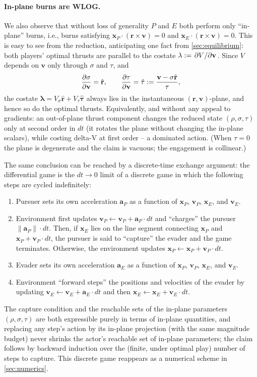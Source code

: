 \documentclass{article}
\newcommand{\eqdef}{:=}
\renewcommand{\vec}[1]{\mathbf{#1}}
\theoremstyle{remark}
\begin{document}
\paragraph{In-plane burns are WLOG.}
We also observe that without loss of generality $P$ and $E$ both perform only
``in-plane'' burns, i.e., burns satisfying
$\ddot{\vec{x}}_P \cdot (\vec{r} \times \vec{v}) = 0$ and
$\ddot{\vec{x}}_E \cdot ( \vec{r} \times \vec{v}) = 0$.  This is easy to
see from the reduction, anticipating one fact from \cref{sec:equilibrium}:
both players' optimal thrusts are parallel to the costate
$\vec\lambda \eqdef \pdv*{V}{\vec v}$.  Since $V$ depends on $\vec v$ only
through $\sigma$ and $\tau$, and
\[
  \pdv{\sigma}{\vec v} = \hat{\vec r}, \qquad
  \pdv{\tau}{\vec v} = \hat{\vec\tau} \eqdef \frac{\vec v - \sigma \hat{\vec
      r}}{\tau},
\]
the costate
$\vec\lambda = V_\sigma \hat{\vec r} + V_\tau \hat{\vec\tau}$ always lies in
the instantaneous $(\vec r, \vec v)$-plane, and hence so do the optimal
thrusts.  Equivalently, and without any appeal to gradients: an out-of-plane
thrust component changes the reduced state $(\rho, \sigma, \tau)$ only at
second order in $dt$ (it rotates the plane without changing the in-plane
scalars), while costing delta-V at first order -- a dominated action.  (When
$\tau = 0$ the plane is degenerate and the claim is vacuous; the engagement
is collinear.)

The same conclusion can be reached by a discrete-time
exchange argument: the differential game is the $dt \to 0$ limit of a discrete
game in which the following steps are cycled indefinitely:
\begin{enumerate}
\item Pursuer sets its own acceleration $\vec{a}_P$ as a function of
  $\vec{x}_P$, $\vec{v}_P$, $\vec{x}_E$, and $\vec{v}_E$.
\item Environment first updates
  $\vec{v}_P \gets \vec{v}_P + \vec{a}_P \cdot dt$ and ``charges'' the pursuer
  $\| \vec{a}_P \| \cdot dt$.  Then, if $\vec{x}_E$ lies on the line segment
  connecting $\vec{x}_P$ and $\vec{x}_P + \vec{v}_P \cdot dt$, the pursuer is
  said to ``capture'' the evader and the game terminates.  Otherwise, the
  environment updates $\vec{x}_P \gets \vec{x}_P + \vec{v}_P \cdot dt$.
\item Evader sets its own acceleration $\vec{a}_E$ as a function of
  $\vec{x}_P$, $\vec{v}_P$, $\vec{x}_E$, and $\vec{v}_E$.
\item Environment ``forward steps'' the positions and velocities of the evader
  by updating
  $\vec{v}_E \gets \vec{v}_E + \vec{a}_E \cdot dt$ and then
  $\vec{x}_E \gets \vec{x}_E + \vec{v}_E \cdot dt$.
\end{enumerate}
The capture condition and the reachable sets of the in-plane parameters
$(\rho, \sigma, \tau)$ are both expressible purely in terms of in-plane
quantities, and replacing any step's action by its in-plane projection (with
the same magnitude budget) never shrinks the actor's reachable set of in-plane
parameters; the claim follows by backward induction over the (finite, under
optimal play) number of steps to capture.  This discrete game reappears as a
numerical scheme in \cref{sec:numerics}.
\end{document}
